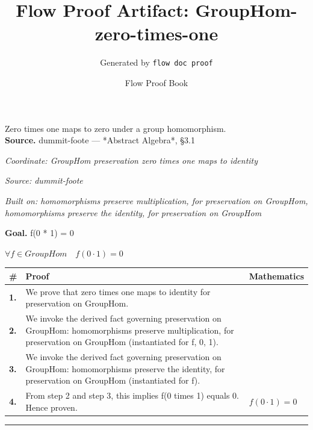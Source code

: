 \documentclass[11pt]{article}
\title{Flow Proof Artifact: GroupHom-zero-times-one}
\author{Generated by \texttt{flow doc proof}}
\date{Flow Proof Book}
\theoremstyle{definition}
\begin{document}
\maketitle
Zero times one maps to zero under a group homomorphism.\\[0.5em]
\textbf{Source.} dummit-foote — *Abstract Algebra*, §3.1\\[0.5em]
\bigskip
{}\par
\smallskip\noindent\textit{Coordinate: GroupHom \cdot preservation \cdot zero times one maps to identity}\par
\smallskip\noindent\textit{Source: dummit-foote}\par
\smallskip\noindent\textit{Built on: homomorphisms preserve multiplication, for preservation on GroupHom, homomorphisms preserve the identity, for preservation on GroupHom}\par
\medskip
\noindent\textbf{Goal.} f(0 * 1) = 0\par
\noindent$\displaystyle \forall f \in GroupHom\quad f(0 \cdot 1) = 0$\par
\medskip
\noindent
\begin{tabular}{@{} >{\raggedright\arraybackslash}p{} >{\raggedright\arraybackslash}p{} >{\raggedleft\arraybackslash}p{} @{}}
\textbf{\#} & \textbf{Proof} & \textbf{Mathematics} \\
\midrule
\textbf{1.} & We prove that zero times one maps to identity for preservation on GroupHom. & \\[0.45em]
\textbf{2.} & We invoke the derived fact governing preservation on GroupHom: homomorphisms preserve multiplication, for preservation on GroupHom (instantiated for f, 0, 1). & \\[0.45em]
\textbf{3.} & We invoke the derived fact governing preservation on GroupHom: homomorphisms preserve the identity, for preservation on GroupHom (instantiated for f). & \\[0.45em]
\textbf{4.} & From step 2 and step 3, this implies f(0 times 1) equals 0. Hence proven. & $\displaystyle f(0 \cdot 1) = 0$ \\[0.45em]
\bottomrule
\end{tabular}
\label{thm:GroupHom-preservation-zero_times_one_maps_to_identity}
\par\medskip\hrule
\end{document}
